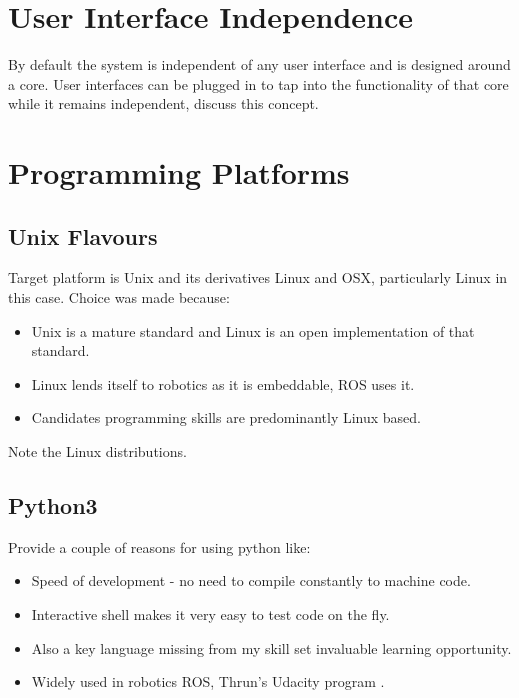 
\section{User Interface Independence}
By default the system is independent of any user interface and is designed around a core. User interfaces can be plugged in to tap into the functionality of that core while it remains independent, discuss this concept.

\newpage


\section{Programming Platforms}

\subsection{Unix Flavours}
Target platform is Unix and its derivatives Linux and OSX, particularly Linux in this case. Choice was made because:

\begin{itemize}
\item Unix is a mature standard and Linux is an open implementation of that standard.
\item Linux lends itself to robotics as it is embeddable, ROS uses it.
\item Candidates programming skills are predominantly Linux based.
\end{itemize} 

Note the Linux distributions.

\subsection{Python3}
Provide a couple of reasons for using python like:

\begin{itemize}
\item Speed of development - no need to compile constantly to machine code.
\item Interactive shell makes it very easy to test code on the fly.
\item Also a key language missing from my skill set invaluable learning opportunity.
\item Widely used in robotics ROS, Thrun's Udacity program .
\end{itemize} 

